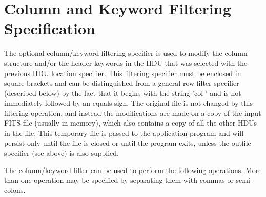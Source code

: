 \documentclass[11pt]{book}
\begin{document}
\section{Column and Keyword Filtering Specification}

The optional column/keyword filtering specifier is used to modify the
column structure and/or the header keywords in the HDU that was
selected with the previous HDU location specifier. This filtering
specifier must be enclosed in square brackets and can be distinguished
from a general row filter specifier (described below) by the fact that
it begins with the string 'col ' and is not immediately followed by an
equals sign.  The original file is not changed by this filtering
operation, and instead the modifications are made on a copy of the
input FITS file (usually in memory), which also contains a copy of all
the other HDUs in the file.  This temporary file is passed to the
application program and will persist only until the file is closed or
until the program exits, unless the outfile specifier (see above) is
also supplied.

The column/keyword filter can be used to perform the following
operations.  More than one operation may be specified by separating
them with commas or semi-colons.
\end{document}
